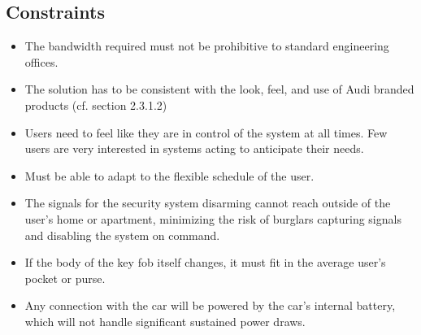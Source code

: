\subsection*{Constraints}
\begin{itemize}

	\item The bandwidth required must not be prohibitive to standard engineering offices. 
	\item The solution has to be consistent with the look, feel, and use of Audi branded products (cf. section 2.3.1.2) 
	\item Users need to feel like they are in control of the system at all times. Few users are very interested in systems acting to anticipate their needs.
	\item Must be able to adapt to the flexible schedule of the user. 
	\item The signals for the security system disarming cannot reach outside of the user's home or apartment, minimizing the risk of burglars capturing signals and disabling the system on command.
	\item If the body of the key fob itself changes, it must fit in the average user's pocket or purse.
	\item Any connection with the car will be powered by the car's internal battery, which will not handle significant sustained power draws. 
\end{itemize}

